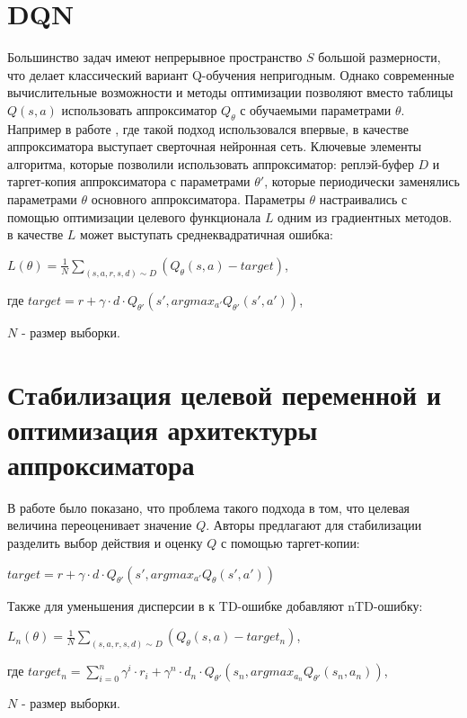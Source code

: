 \documentclass{mipt-thesis-bs}
\begin{document}
\section{DQN}

Большинство задач имеют непрерывное пространство $S$ большой размерности, что делает классический вариант Q-обучения непригодным. Однако современные вычислительные возможности и методы оптимизации позволяют вместо таблицы $Q(s,a)$ использовать аппроксиматор $Q_\theta$ с обучаемыми параметрами $\theta$. Например в работе \cite{dqn}, где такой подход использовался впервые, в качестве аппроксиматора выступает сверточная нейронная сеть. Ключевые элементы алгоритма, которые позволили использовать аппроксиматор: реплэй-буфер $D$ и таргет-копия аппроксиматора с параметрами $\theta'$, которые периодически заменялись параметрами $\theta$ основного аппроксиматора. Параметры $\theta$ настраивались с помощью оптимизации  целевого функционала $L$ одним из градиентных методов. в качестве $L$ может выступать среднеквадратичная ошибка:

\begin{center}
    
$L(\theta)=\frac{1}{N}\sum_{(s,a,r,s,d) \sim D} (Q_\theta(s, a) - target)$,

где $target = r + \gamma\cdot d \cdot Q_{\theta'}(s',argmax_{a'}Q_{\theta'}(s',a'))$,

$N$ - размер выборки.
\end{center}

\section{Стабилизация целевой переменной и оптимизация архитектуры аппроксиматора}

В работе \cite{double dqn} было показано, что проблема такого подхода в том, что целевая величина переоценивает значение $Q$. Авторы предлагают для стабилизации разделить выбор действия и оценку $Q$ с помощью таргет-копии:

\begin{center}
$target = r + \gamma\cdot d \cdot Q_{\theta'}(s',argmax_{a'}Q_{\theta}(s',a'))$ 
\end{center}

Также для уменьшения дисперсии в \cite{n-step} к TD-ошибке добавляют nTD-ошибку:

\begin{center}
$L_n(\theta)=\frac{1}{N}\sum_{(s,a,r,s,d) \sim D} (Q_\theta(s, a) - target_n)$,

где $target_n = \sum_{i=0}^{n}\gamma^i\cdot r_i + \gamma^n\cdot d_n \cdot Q_{\theta'}(s_n,argmax_{a_n}Q_{\theta'}(s_n,a_n))$,

$N$ - размер выборки.
\end{center}
\end{document}

